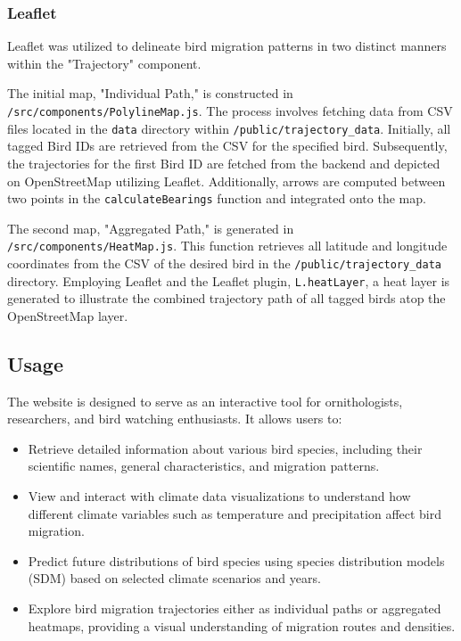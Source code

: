 \documentclass{article}
\begin{document}
\subsubsection{Leaflet}
Leaflet was utilized to delineate bird migration patterns in two distinct manners within the "Trajectory" component. 

The initial map, "Individual Path," is constructed in \texttt{/src/components/PolylineMap.js}. The process involves fetching data from CSV files located in the \texttt{data} directory within \texttt{/public/trajectory\_data}. Initially, all tagged Bird IDs are retrieved from the CSV for the specified bird. Subsequently, the trajectories for the first Bird ID are fetched from the backend and depicted on OpenStreetMap utilizing Leaflet. Additionally, arrows are computed between two points in the \texttt{calculateBearings} function and integrated onto the map.

The second map, "Aggregated Path," is generated in \texttt{/src/components/HeatMap.js}. This function retrieves all latitude and longitude coordinates from the CSV of the desired bird in the \texttt{/public/trajectory\_data} directory. Employing Leaflet and the Leaflet plugin, \texttt{L.heatLayer}, a heat layer is generated to illustrate the combined trajectory path of all tagged birds atop the OpenStreetMap layer.


\subsection{Usage}
The website is designed to serve as an interactive tool for ornithologists, researchers, and bird watching enthusiasts. It allows users to:

\begin{itemize}
    \item Retrieve detailed information about various bird species, including their scientific names, general characteristics, and migration patterns.
    \item View and interact with climate data visualizations to understand how different climate variables such as temperature and precipitation affect bird migration.
    \item Predict future distributions of bird species using species distribution models (SDM) based on selected climate scenarios and years.
    \item Explore bird migration trajectories either as individual paths or aggregated heatmaps, providing a visual understanding of migration routes and densities.
\end{itemize}
\end{document}
